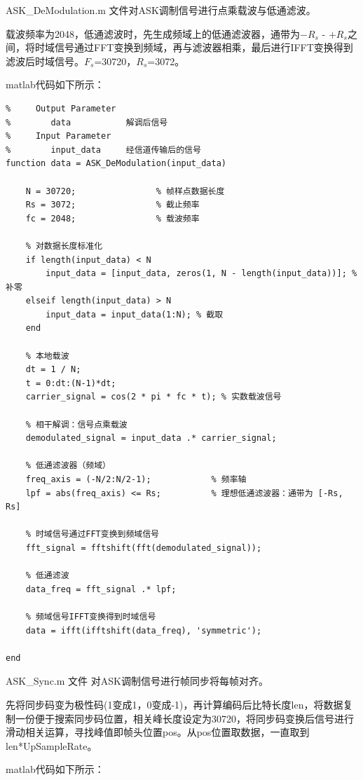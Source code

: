 \documentclass[UTF8]{ctexart}
\begin{document}
ASK\_DeModulation.m 文件对ASK调制信号进行点乘载波与低通滤波。

载波频率为2048，低通滤波时，先生成频域上的低通滤波器，通带为$-R_s$ - $+R_s$之间，将时域信号通过FFT变换到频域，再与滤波器相乘，最后进行IFFT变换得到滤波后时域信号。$F_s$=30720，$R_s$=3072。

matlab代码如下所示：

\begin{lstlisting}[title=ASK\_DeModulation.m, frame=shadowbox]
%  Parameter List:       
%     Output Parameter
%        data	        解调后信号
%     Input Parameter
%        input_data     经信道传输后的信号
function data = ASK_DeModulation(input_data)

    N = 30720;                % 帧样点数据长度
    Rs = 3072;                % 截止频率
    fc = 2048;                % 载波频率

    % 对数据长度标准化
    if length(input_data) < N
        input_data = [input_data, zeros(1, N - length(input_data))]; % 补零
    elseif length(input_data) > N
        input_data = input_data(1:N); % 截取
    end

    % 本地载波
    dt = 1 / N;               
    t = 0:dt:(N-1)*dt;         
    carrier_signal = cos(2 * pi * fc * t); % 实数载波信号

    % 相干解调：信号点乘载波
    demodulated_signal = input_data .* carrier_signal;

    % 低通滤波器（频域）
    freq_axis = (-N/2:N/2-1);            % 频率轴
    lpf = abs(freq_axis) <= Rs;          % 理想低通滤波器：通带为 [-Rs, Rs]

    % 时域信号通过FFT变换到频域信号
    fft_signal = fftshift(fft(demodulated_signal));

    % 低通滤波
    data_freq = fft_signal .* lpf;

    % 频域信号IFFT变换得到时域信号
    data = ifft(ifftshift(data_freq), 'symmetric');

end
\end{lstlisting}

ASK\_Sync.m 文件 对ASK调制信号进行帧同步将每帧对齐。

先将同步码变为极性码(1变成1，0变成-1)，再计算编码后比特长度len，将数据复制一份便于搜索同步码位置，相关峰长度设定为30720，将同步码变换后信号进行滑动相关运算，寻找峰值即帧头位置pos。从pos位置取数据，一直取到len*UpSampleRate。

matlab代码如下所示：
\end{document}
